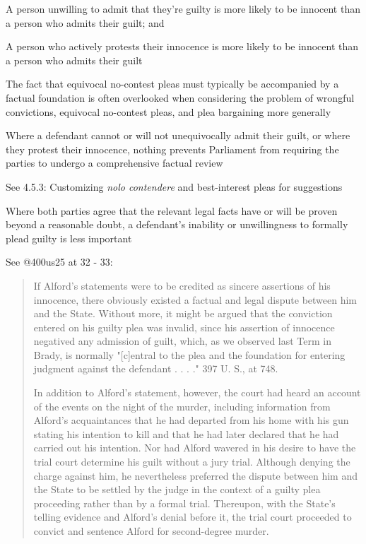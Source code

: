 A person unwilling to admit that they're guilty is more likely to be innocent than a person who admits their guilt; and

A person who actively protests their innocence is more likely to be innocent than a person who admits their guilt

The fact that equivocal no-contest pleas must typically be accompanied by a factual foundation is often overlooked when considering the problem of wrongful convictions, equivocal no-contest pleas, and plea bargaining more generally

Where a defendant cannot or will not unequivocally admit their guilt, or where they protest their innocence, nothing prevents Parliament from requiring the parties to undergo a comprehensive factual review

See 4.5.3: Customizing \textit{nolo contendere} and best-interest pleas for suggestions

Where both parties agree that the relevant legal facts have or will be proven beyond a reasonable doubt, a defendant's inability or unwillingness to formally plead guilty is less important

See @400us25 at 32 - 33:
\begin{quote}
    If Alford's statements were to be credited as sincere assertions of his innocence, there obviously existed a factual and legal dispute between him and the State. Without more, it might be argued that the conviction entered on his guilty plea was invalid, since his assertion of innocence negatived any admission of guilt, which, as we observed last Term in Brady, is normally "[c]entral to the plea and the foundation for entering judgment against the defendant . . . ." 397 U. S., at 748.
    
    In addition to Alford's statement, however, the court had heard an account of the events on the night of the murder, including information from Alford's acquaintances that he had departed from his home with his gun stating his intention to kill and that he had later declared that he had carried out his intention. Nor had Alford wavered in his desire to have the trial court determine his guilt without a jury trial. Although denying the charge against him, he nevertheless preferred the dispute between him and the State to be settled by the judge in the context of a guilty plea proceeding rather than by a formal trial. Thereupon, with the State's telling evidence and Alford's denial before it, the trial court proceeded to convict and sentence Alford for second-degree murder.
\end{quote}

